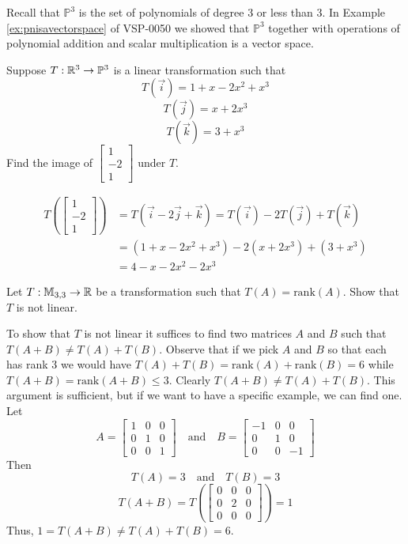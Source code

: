 \documentclass{ximera}
\begin{document}
\begin{example}\label{ex:abstvecsplintrans2}
Recall that $\mathbb{P}^3$ is the set of polynomials of degree $3$ or less than $3$.  In Example \ref{ex:pnisavectorspace} of VSP-0050 we showed that $\mathbb{P}^3$ together with operations of polynomial addition and scalar multiplication is a vector space. 

Suppose $T:\mathbb{R}^3\rightarrow\mathbb{P}^3$ is a linear transformation such that 
$$T(\vec{i})=1+x-2x^2+x^3$$
$$T(\vec{j})=x+2x^3$$
$$T(\vec{k})=3+x^3$$
Find the image of $\begin{bmatrix}1\\-2\\1\end{bmatrix}$ under $T$.
\begin{explanation}
\begin{align*}
    T\left(\begin{bmatrix}1\\-2\\1\end{bmatrix}\right)&=T(\vec{i}-2\vec{j}+\vec{k})=T(\vec{i})-2T(\vec{j})+T(\vec{k})\\
    &=(1+x-2x^2+x^3)-2(x+2x^3)+(3+x^3)\\
    &=4-x-2x^2-2x^3
\end{align*}
\end{explanation}
\end{example}

\begin{example}\label{ex:nonlinabstvectsp}
Let $T:\mathbb{M}_{3,3}\rightarrow \mathbb{R}$ be a transformation such that $T(A)=\mbox{rank}(A)$.  Show that $T$ is not linear.
\begin{explanation}
To show that $T$ is not linear it suffices to find two matrices $A$ and $B$ such that $T(A+B)\neq T(A)+T(B)$.  Observe that if we pick $A$ and $B$ so that each has rank $3$ we would have $T(A)+T(B)=\mbox{rank}(A)+\mbox{rank}(B)=6$ while $T(A+B)=\mbox{rank}(A+B)\leq 3$.  Clearly  $T(A+B)\neq T(A)+T(B)$.  This argument is sufficient, but if we want to have a specific example, we can find one.
Let $$A=\begin{bmatrix}1&0&0\\0&1&0\\0&0&1\end{bmatrix} \quad\text{and}\quad B=\begin{bmatrix}-1&0&0\\0&1&0\\0&0&-1\end{bmatrix}$$
Then
$$T(A)=3\quad\text{and}\quad T(B)=3$$
$$T(A+B)=T\left(\begin{bmatrix}0&0&0\\0&2&0\\0&0&0\end{bmatrix}\right)=1$$
Thus, $1=T(A+B)\neq T(A)+T(B)=6$.
\end{explanation}
\end{example}
\end{document}
